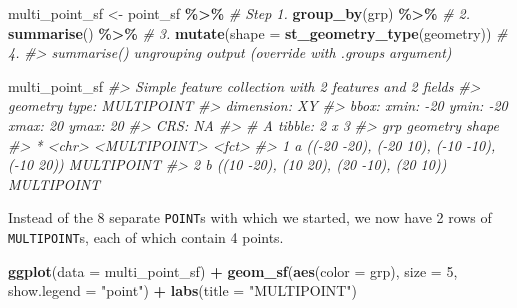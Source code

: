 \documentclass[
]{report}
\newenvironment{Shaded}{\begin{snugshade}}{\end{snugshade}}
\newcommand{\CommentTok}[1]{\textcolor[rgb]{0.56,0.35,0.01}{\textit{#1}}}
\newcommand{\DataTypeTok}[1]{\textcolor[rgb]{0.13,0.29,0.53}{#1}}
\newcommand{\DecValTok}[1]{\textcolor[rgb]{0.00,0.00,0.81}{#1}}
\newcommand{\KeywordTok}[1]{\textcolor[rgb]{0.13,0.29,0.53}{\textbf{#1}}}
\newcommand{\NormalTok}[1]{#1}
\newcommand{\OperatorTok}[1]{\textcolor[rgb]{0.81,0.36,0.00}{\textbf{#1}}}
\newcommand{\StringTok}[1]{\textcolor[rgb]{0.31,0.60,0.02}{#1}}
\begin{document}
\begin{Shaded}
\begin{Highlighting}[]
\NormalTok{multi\_point\_sf \textless{}{-}}\StringTok{ }\NormalTok{point\_sf }\OperatorTok{\%\textgreater{}\%}\StringTok{               }\CommentTok{\# Step 1.}
\StringTok{  }\KeywordTok{group\_by}\NormalTok{(grp) }\OperatorTok{\%\textgreater{}\%}\StringTok{                          }\CommentTok{\# 2.}
\StringTok{  }\KeywordTok{summarise}\NormalTok{() }\OperatorTok{\%\textgreater{}\%}\StringTok{                            }\CommentTok{\# 3.}
\StringTok{  }\KeywordTok{mutate}\NormalTok{(}\DataTypeTok{shape =} \KeywordTok{st\_geometry\_type}\NormalTok{(geometry)) }\CommentTok{\# 4.}
\CommentTok{\#\textgreater{} \textasciigrave{}summarise()\textasciigrave{} ungrouping output (override with \textasciigrave{}.groups\textasciigrave{} argument)}

\NormalTok{multi\_point\_sf}
\CommentTok{\#\textgreater{} Simple feature collection with 2 features and 2 fields}
\CommentTok{\#\textgreater{} geometry type:  MULTIPOINT}
\CommentTok{\#\textgreater{} dimension:      XY}
\CommentTok{\#\textgreater{} bbox:           xmin: {-}20 ymin: {-}20 xmax: 20 ymax: 20}
\CommentTok{\#\textgreater{} CRS:            NA}
\CommentTok{\#\textgreater{} \# A tibble: 2 x 3}
\CommentTok{\#\textgreater{}   grp                                     geometry shape     }
\CommentTok{\#\textgreater{} * \textless{}chr\textgreater{}                               \textless{}MULTIPOINT\textgreater{} \textless{}fct\textgreater{}     }
\CommentTok{\#\textgreater{} 1 a     (({-}20 {-}20), ({-}20 10), ({-}10 {-}10), ({-}10 20)) MULTIPOINT}
\CommentTok{\#\textgreater{} 2 b         ((10 {-}20), (10 20), (20 {-}10), (20 10)) MULTIPOINT}
\end{Highlighting}
\end{Shaded}

Instead of the 8 separate \texttt{POINT}s with which we started, we now have 2 rows of \texttt{MULTIPOINT}s, each of which contain 4 points.

\begin{Shaded}
\begin{Highlighting}[]
\KeywordTok{ggplot}\NormalTok{(}\DataTypeTok{data =}\NormalTok{ multi\_point\_sf) }\OperatorTok{+}\StringTok{ }
\StringTok{  }\KeywordTok{geom\_sf}\NormalTok{(}\KeywordTok{aes}\NormalTok{(}\DataTypeTok{color =}\NormalTok{ grp), }\DataTypeTok{size =} \DecValTok{5}\NormalTok{, }\DataTypeTok{show.legend =} \StringTok{"point"}\NormalTok{) }\OperatorTok{+}
\StringTok{  }\KeywordTok{labs}\NormalTok{(}\DataTypeTok{title =} \StringTok{"MULTIPOINT"}\NormalTok{)}
\end{Highlighting}
\end{Shaded}
\end{document}
